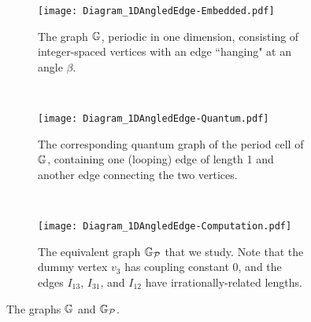 \begin{figure}[t]
	\centering
	\begin{subfigure}[t]{0.3\textwidth}
		\centering
		\texttt{[image: Diagram\_1DAngledEdge-Embedded.pdf]}
		\caption{\label{fig:Diagram_1DAngledEdge-Embedded} The graph $\mathbb{G}$, periodic in one dimension, consisting of integer-spaced vertices with an edge ``hanging" at an angle $\beta$.}
	\end{subfigure}
	~
	\begin{subfigure}[t]{0.3\textwidth}
		\centering
		\texttt{[image: Diagram\_1DAngledEdge-Quantum.pdf]}
		\caption{\label{fig:Diagram_1DAngledEdge-Quantum} The corresponding quantum graph of the period cell of $\mathbb{G}$, containing one (looping) edge of length 1 and another edge connecting the two vertices.}
	\end{subfigure}
	~
	\begin{subfigure}[t]{0.3\textwidth}
		\centering
		\texttt{[image: Diagram\_1DAngledEdge-Computation.pdf]}	
		\caption{\label{fig:Diagram_1DAngledEdge-Computation} The equivalent graph $\mathbb{G}_{\mathcal{P}}$ that we study. Note that the dummy vertex $v_3$ has coupling constant 0, and the edges $I_{13}$, $I_{31}$, and $I_{12}$ have irrationally-related lengths.}
	\end{subfigure}
	\caption{\label{fig:Diagram_1DAngledEdgeExample} The graphs $\mathbb{G}$ and $\mathbb{G}_{\mathcal{P}}$.}
\end{figure}

